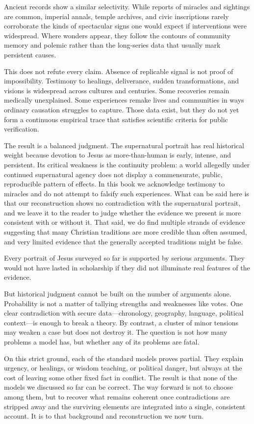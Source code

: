 Ancient records show a similar selectivity.
While reports of miracles and sightings are common, imperial annals, temple archives, and civic inscriptions rarely corroborate the kinds of spectacular signs one would expect if interventions were widespread.
Where wonders appear, they follow the contours of community memory and polemic rather than the long-series data that usually mark persistent causes.

This does not refute every claim.
Absence of replicable signal is not proof of impossibility.
Testimony to healings, deliverance, sudden transformations, and visions is widespread across cultures and centuries.
Some recoveries remain medically unexplained.
Some experiences remake lives and communities in ways ordinary causation struggles to capture.
Those data exist, but they do not yet form a continuous empirical trace that satisfies scientific criteria for public verification.

The result is a balanced judgment.
The supernatural portrait has real historical weight because devotion to Jesus as more-than-human is early, intense, and persistent.
Its critical weakness is the continuity problem: a world allegedly under continued supernatural agency does not display a commensurate, public, reproducible pattern of effects.
In this book we acknowledge testimony to miracles and do not attempt to falsify such experiences.
What can be said here is that our reconstruction shows no contradiction with the supernatural portrait, and we leave it to the reader to judge whether the evidence we present is more consistent with or without it.
That said, we do find multiple strands of evidence suggesting that many Christian traditions are more credible than often assumed, and very limited evidence that the generally accepted traditions might be false.

\medskip

Every portrait of Jesus surveyed so far is supported by serious arguments.
They would not have lasted in scholarship if they did not illuminate real features of the evidence.

But historical judgment cannot be built on the number of arguments alone.
Probability is not a matter of tallying strengths and weaknesses like votes.
One clear contradiction with secure data—chronology, geography, language, political context—is enough to break a theory.
By contrast, a cluster of minor tensions may weaken a case but does not destroy it.
The question is not how many problems a model has, but whether any of its problems are fatal.

On this strict ground, each of the standard models proves partial.
They explain urgency, or healings, or wisdom teaching, or political danger, but always at the cost of leaving some other fixed fact in conflict.
The result is that none of the models we discussed so far can be correct.
The way forward is not to choose among them, but to recover what remains coherent once contradictions are stripped away and the surviving elements are integrated into a single, consistent account.
It is to that background and reconstruction we now turn.
